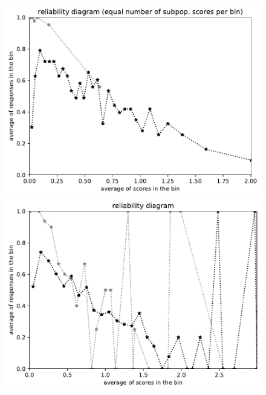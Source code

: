 \documentclass{article}
\newlength{\vertsep}
\newlength{\imsize}
\begin{document}
\begin{figure}
\begin{centering}
\parbox{\imsize}{\includegraphics[width=\imsize]
{../codes/unweighted/nll-1-60-night-snake-Hypsiglena-torquata_323-monarch-monarch-butterfly-milkweed-butterfly-Danaus-plexippusequisamps30.pdf}}
\quad\quad
\parbox{\imsize}{\includegraphics[width=\imsize]
{../codes/unweighted/nll-1-60-night-snake-Hypsiglena-torquata_323-monarch-monarch-butterfly-milkweed-butterfly-Danaus-plexippusequiscore30.pdf}}

\vspace{\vertsep}


\end{centering}
\end{figure}
\end{document}
